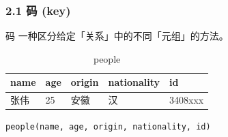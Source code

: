 \documentclass[aspectratio=169, 14pt]{beamer}
\begin{document}
\begin{frame}
    \frametitle{2.1 码 (key)}
\begin{exampleblock}{码}
    一种区分给定「关系」中的不同「元组」的方法。
\end{exampleblock}
    
\begin{table}
    \caption*{people}
    \begin{tabular}{lllll}
      \toprule
      name & age & origin & nationality & id \\
      \midrule
      张伟 & 25 & 安徽 & 汉 & 3408xxx \\
      \bottomrule
    \end{tabular}
\end{table}
\texttt{people(name, age, origin, nationality, id)}
\end{frame}
\end{document}
